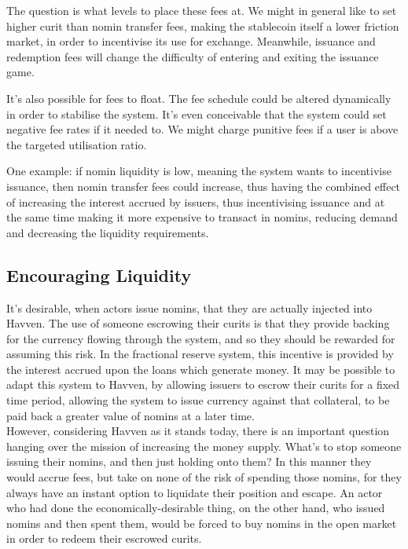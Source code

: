 \documentclass{article}
\begin{document}
The question is what levels to place these fees at. We might in general like to set
higher curit than nomin transfer fees, making the stablecoin itself a lower friction market,
in order to incentivise its use for exchange. Meanwhile, issuance and redemption fees will
change the difficulty of entering and exiting the issuance game.

It's also possible for fees to float. The fee schedule could be altered dynamically in order
to stabilise the system. It's even conceivable that the system could set negative fee rates if it needed to.
We might charge punitive fees if a user is above the targeted utilisation ratio.

One example: if nomin liquidity is low, meaning the system wants to incentivise issuance,
then nomin transfer fees could increase, thus having the combined effect of increasing the interest accrued
by issuers, thus incentivising issuance and at the same time making it more expensive to transact in nomins,
reducing demand and decreasing the liquidity requirements.


\pagebreak
\subsection{Encouraging Liquidity}

It's desirable, when actors issue nomins, that they are actually injected into Havven.
The use of someone escrowing their curits is that they provide backing for the currency flowing through the system,
and so they should be rewarded for assuming this risk. In the fractional reserve system,
this incentive is provided by the interest accrued upon the loans which generate money.
It may be possible to adapt this system to Havven, by allowing issuers to escrow their curits
for a fixed time period, allowing the system to issue currency against that collateral,
to be paid back a greater value of nomins at a later time. \\

However, considering Havven as it stands today, there is an important question hanging over the 
mission of increasing the money supply.
What's to stop someone issuing their nomins, and then just holding onto them? In this manner they
would accrue fees, but take on none of the risk of spending those nomins, for they always have an instant
option to liquidate their position and escape. An actor who had done the economically-desirable thing, on
the other hand, who issued nomins and then spent them, would be forced to buy nomins in the open market in
order to redeem their escrowed curits. \\
\end{document}
